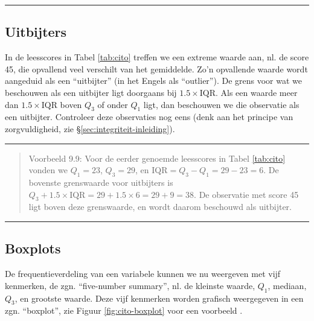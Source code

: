 \documentclass[
]{book}
\begin{document}
\begin{center}\rule{0.5\linewidth}{0.5pt}\end{center}

\hypertarget{sec:uitbijters}{%
\subsection{Uitbijters}\label{sec:uitbijters}}

In de leesscores in Tabel \ref{tab:cito} treffen we een extreme waarde aan, nl. de score
45, die opvallend veel verschilt van het gemiddelde. Zo'n opvallende
waarde wordt aangeduid als een ``uitbijter'' (in het Engels als
``outlier''). De grens voor wat we beschouwen als een uitbijter ligt
doorgaans bij \(1.5 \times \textrm{IQR}\). Als een waarde meer dan
\(1.5 \times \textrm{IQR}\) boven \(Q_3\) of onder \(Q_1\) ligt, dan
beschouwen we die observatie als een uitbijter. Controleer deze
observaties nog eens (denk aan het principe van zorgvuldigheid, zie
§\ref{sec:integriteit-inleiding}).

\begin{center}\rule{0.5\linewidth}{0.5pt}\end{center}

\begin{quote}
Voorbeeld 9.9:
Voor de eerder genoemde leesscores in
Tabel \ref{tab:cito} vonden
we \(Q_1=23\), \(Q_3=29\), en \(\textrm{IQR}=Q_3-Q_1=29-23=6\). De bovenste
grenswaarde voor uitbijters is
\(Q_3 + 1.5 \times \textrm{IQR} = 29 + 1.5 \times 6 = 29+9 = 38\). De
observatie met score 45 ligt boven deze grenswaarde, en wordt daarom
beschouwd als uitbijter.
\end{quote}

\begin{center}\rule{0.5\linewidth}{0.5pt}\end{center}

\hypertarget{sec:boxplot}{%
\subsection{Boxplots}\label{sec:boxplot}}

De frequentieverdeling van een variabele kunnen we nu weergeven met vijf
kenmerken, de zgn. ``five-number summary'', nl. de kleinste waarde, \(Q_1\),
mediaan, \(Q_3\), en grootste waarde. Deze vijf kenmerken worden grafisch
weergegeven in een zgn. ``boxplot'', zie
Figuur \ref{fig:cito-boxplot} voor een voorbeeld \citep[ §2C]{Tukey77}.
\end{document}
